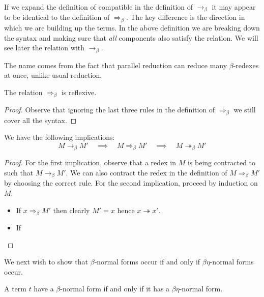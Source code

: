 \begin{remark}
    If we expand the definition of compatible in the definition of $\to_{\beta}$ it may appear to be identical to the definition of $\Rightarrow_{\beta}$. The key difference is the direction in which we are building up the terms. In the above definition we are breaking down the syntax and making sure that \emph{all} components also satisfy the relation. We will see later the relation with $\to_{\beta}$.
\end{remark}

\begin{remark}
    The name comes from the fact that parallel reduction can reduce many $\beta$-redexes at once, unlike usual reduction.
\end{remark}

\begin{cor}
    The relation $\Rightarrow_\beta$ is reflexive.
\end{cor}

\begin{proof}
    Observe that ignoring the last three rules in the definition of $\Rightarrow_\beta$ we still cover all the syntax.
\end{proof}

\begin{lemma}
    We have the following implications:
    $$
        M \to_\beta M' \quad \implies \quad M \Rightarrow_\beta M' \quad \implies \quad M \twoheadrightarrow_\beta M'
    $$
\end{lemma}

\begin{proof}
    For the first implication, observe that a redex in $M$ is being contracted to such that $M \to_\beta M'$. We can also contract the redex in the definition of $M \Rightarrow_\beta M'$ by choosing the correct rule. For the second implication, proceed by induction on $M$:
    \begin{itemize}
        \item If $x \Rightarrow_\beta M'$ then clearly $M'=x$ hence $x \twoheadrightarrow x'$.
        \item If 
    \end{itemize}
\end{proof}



We next wish to show that $\beta$-normal forms occur if and only if $\beta \eta$-normal forms occur.

\begin{lemma}\label{beta_SN_beta_eta_SN}
    A term $t$ have a $\beta$-normal form if and only if it has a $\beta \eta$-normal form.
\end{lemma}

